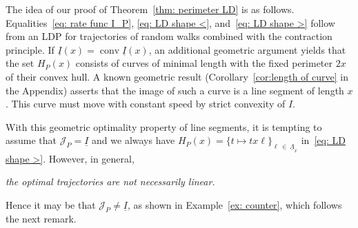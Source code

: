 \documentclass[10pt]{amsart}
\theoremstyle{definition}\newtheorem{defi}[theo]{Definition}\newtheorem{rema}[theo]{Remark}\newtheorem{exam}[theo]{Example}\newtheorem{exem}[theo]{Example}\newtheorem{nota}[theo]{Notation}
\DeclareMathOperator{\conv}{conv}
\newcommand{\ubar}[1]{\underline{#1}}
\newcommand{\Jcl}{\mathcal{J}}
\begin{document}
The idea of our proof of Theorem~\ref{thm: perimeter LD} is as follows. Equalities~\eqref{eq: rate func I_P}, \eqref{eq: LD shape <}, and~\eqref{eq: LD shape >} follow from an LDP for trajectories of random walks combined with the contraction principle. If $\ubar I(x) = \conv \ubar I(x)$, an additional geometric argument yields that the set $H_P(x)$ consists of curves of minimal length with the fixed perimeter $2x$ of their convex hull. A known geometric result (Corollary~\ref{cor:length of curve} in the Appendix) asserts that the image of such a curve is a line segment of length $x$. This curve must move with constant speed by strict convexity of $I$.

With this geometric optimality property of line segments, it is tempting to assume that $\Jcl_P = \ubar I$ and we always have $H_P(x)=\{t \mapsto t x \ell\}_{\ell\,\in\, \ubar\Lambda_x}$ in~\eqref{eq: LD shape >}. However, in general,
\begin{center}
\emph{the optimal trajectories are not necessarily linear.}
\end{center}
Hence it may be that $\Jcl_P \neq \ubar I$, as shown in Example~\ref{ex: counter}, which follows the next remark.
\end{document}

